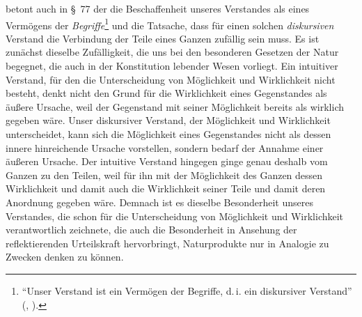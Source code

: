  betont auch in \S~77 der 
die Beschaffenheit unseres Verstandes als eines Vermögens der
\emph{Begriffe}\footnote{\enquote{Unser Verstand ist ein Vermögen der Begriffe,
d.\,i. ein diskursiver Verstand}
\mkbibparens{\cite[][\S~77]{Kant:KritikderUrteilskraft2009}, \cite[][V:
406.16--17]{Kant:GesammelteWerke1900ff.}}.} und die Tatsache, dass für einen
solchen \emph{diskursiven} Verstand die Verbindung der Teile eines Ganzen
zufällig sein muss. Es ist zunächst dieselbe
Zufälligkeit, die uns bei den besonderen Gesetzen der Natur begegnet, die auch
in der Konstitution lebender Wesen vorliegt. Ein intuitiver Verstand, für den die
Unterscheidung von Möglichkeit und Wirklichkeit nicht besteht, denkt nicht den
Grund für die Wirklichkeit eines Gegenstandes als äußere Ursache, weil der
Gegenstand mit seiner Möglichkeit bereits als wirklich gegeben wäre. Unser
diskursiver Verstand, der Möglichkeit und Wirklichkeit unterscheidet, kann sich
die Möglichkeit eines Gegenstandes nicht als dessen innere hinreichende Ursache
vorstellen, sondern bedarf der Annahme einer äußeren Ursache. Der intuitive
Verstand hingegen ginge genau deshalb vom Ganzen zu den Teilen, weil für ihn mit
der Möglichkeit des Ganzen dessen Wirklichkeit und damit auch die Wirklichkeit
seiner Teile und damit deren Anordnung gegeben wäre. Demnach ist es dieselbe Besonderheit
unseres Verstandes, die schon für die Unterscheidung von Möglichkeit und Wirklichkeit
verantwortlich zeichnete, die auch die Besonderheit in Ansehung der
reflektierenden Urteilskraft hervorbringt, Naturprodukte nur in Analogie zu
Zwecken denken zu können.

